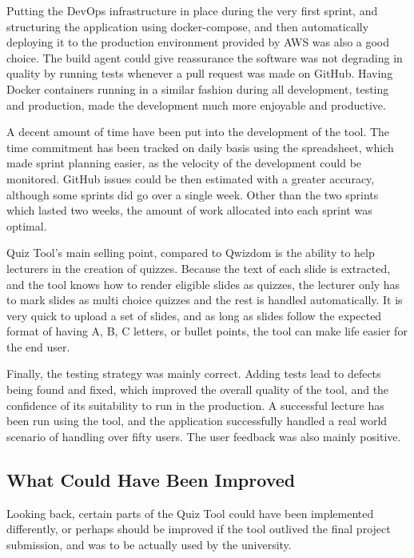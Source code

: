 Putting the DevOps infrastructure in place during the very first sprint, and structuring
the application using docker-compose, and then automatically deploying it to the
production environment provided by AWS was also a good choice. The build agent
could give reassurance the software was not degrading in quality by running tests
whenever a pull request was made on GitHub. Having Docker containers running in a
similar fashion during all development, testing and production, made the development
much more enjoyable and productive.

A decent amount of time have been put into the development of the tool. The time
commitment has been tracked on daily basis using the spreadsheet\cite{}, which
made sprint planning easier, as the velocity of the development could be monitored.
GitHub issues could be then estimated with a greater accuracy, although some
sprints did go over a single week. Other than the two sprints which lasted two weeks,
the amount of work allocated into each sprint was optimal.

Quiz Tool's main selling point, compared to Qwizdom is the ability to help lecturers
in the creation of quizzes. Because the text of each slide is extracted, and the tool
knows how to render eligible slides as quizzes, the lecturer only has to mark
slides as multi choice quizzes and the rest is handled automatically. It is very quick
to upload a set of slides, and as long as slides follow the expected format of having
A, B, C letters, or bullet points, the tool can make life easier for the end user.

Finally, the testing strategy was mainly correct. Adding tests lead to defects being
found and fixed, which improved the overall quality of the tool, and the confidence
of its suitability to run in the production. A successful lecture has been run using
the tool, and the application successfully handled a real world scenario of handling
over fifty users. The user feedback was also mainly positive.

\subsection{What Could Have Been Improved}
Looking back, certain parts of the Quiz Tool could have been implemented differently,
or perhaps should be improved if the tool outlived the final project submission, and was
to be actually used by the university.

